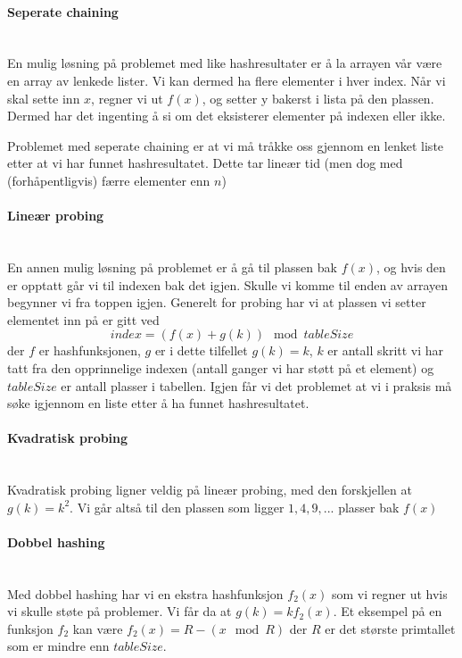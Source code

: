 \paragraph{Seperate chaining}~\\
En mulig løsning på problemet med like hashresultater er å la arrayen vår være en array av lenkede lister. Vi kan dermed ha flere elementer i hver index. Når vi skal sette inn $ x $, regner vi ut $ f(x) $, og setter y bakerst i lista på den plassen. Dermed har det ingenting å si om det eksisterer elementer på indexen eller ikke. 

Problemet med seperate chaining er at vi må tråkke oss gjennom en lenket liste etter at vi har funnet hashresultatet. Dette tar lineær tid (men dog med (forhåpentligvis) færre elementer enn $ n $)


\paragraph{Lineær probing}~\\
En annen mulig løsning på problemet er å gå til plassen bak $ f(x) $, og hvis den er opptatt går vi til indexen bak det igjen. Skulle vi komme til enden av arrayen begynner vi fra toppen igjen. Generelt for probing har vi at plassen vi setter elementet inn på er gitt ved
\[ index = (f(x) + g(k)) \mod{tableSize} \]
der $ f $ er hashfunksjonen, $ g $ er i dette tilfellet $ g(k) = k $, $ k $ er antall skritt vi har tatt fra den opprinnelige indexen (antall ganger vi har støtt på et element) og $ tableSize $ er antall plasser i tabellen. Igjen får vi det problemet at vi i praksis må søke igjennom en liste etter å ha funnet hashresultatet. 

\paragraph{Kvadratisk probing}~\\
Kvadratisk probing ligner veldig på lineær probing, med den forskjellen at $ g(k) = k^2 $. Vi går altså til den plassen som ligger $ 1, 4, 9, ... $ plasser bak $ f(x) $

\paragraph{Dobbel hashing}~\\
Med dobbel hashing har vi en ekstra hashfunksjon $ f_2(x) $ som vi regner ut hvis vi skulle støte på problemer. Vi får da at $ g(k) = k f_2(x) $. Et eksempel på en funksjon $ f_2 $ kan være $ f_2(x) = R-(x \mod R) $ der $ R $ er det største primtallet som er mindre enn $ tableSize $. 

